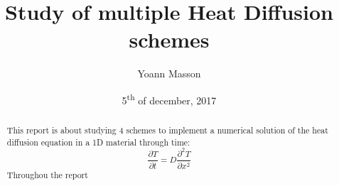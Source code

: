 \documentclass[12pt, a4paper]{report}
\title{Study of multiple Heat Diffusion schemes}
\author{Yoann Masson}
\date{5\textsuperscript{th} of december, 2017}
\begin{document}
\begin{titlepage}
\maketitle
\end{titlepage}
\begin{abstract}
This report is about studying 4 schemes to implement a numerical solution of the heat diffusion equation in a 1D material through time: \begin{equation}\frac{\partial T}{\partial t} = D\frac{\partial^2T }{\partial x^2}
\end{equation} Throughou the report
\end{abstract}
\tableofcontents
\end{document}
